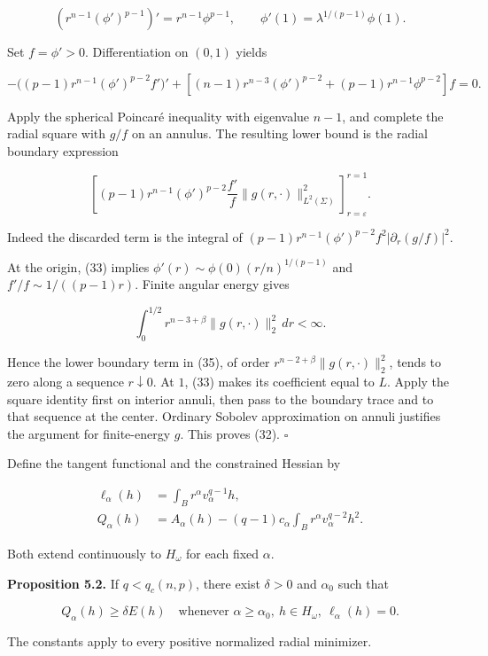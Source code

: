 \documentclass[11pt]{article}
\begin{document}
\[
(r^{n-1}(\phi')^{p-1})'=r^{n-1}\phi^{p-1},
\qquad \phi'(1)=\lambda^{1/(p-1)}\phi(1).
\tag{33}
\]

Set \(f=\phi'>0\). Differentiation on \((0,1)\) yields

\[
-\bigl((p-1)r^{n-1}(\phi')^{p-2}f'\bigr)'
+\left[(n-1)r^{n-3}(\phi')^{p-2}
 +(p-1)r^{n-1}\phi^{p-2}\right]f=0.
\tag{34}
\]

Apply the spherical Poincaré inequality with eigenvalue \(n-1\), and
complete the radial square with \(g/f\) on an annulus. The resulting
lower bound is the radial boundary expression

\[
\left[(p-1)r^{n-1}(\phi')^{p-2}\frac{f'}f
 \|g(r,\cdot)\|_{L^2(\Sigma)}^2\right]_{r=\varepsilon}^{r=1}.
\tag{35}
\]

Indeed the discarded term is the integral of
\((p-1)r^{n-1}(\phi')^{p-2}f^2|\partial_r(g/f)|^2\).

At the origin, (33) implies \(\phi'(r)\sim\phi(0)(r/n)^{1/(p-1)}\) and
\(f'/f\sim1/((p-1)r)\). Finite angular energy gives

\[
\int_0^{1/2}r^{n-3+\beta}\|g(r,\cdot)\|_2^2\,dr<\infty.
\]

Hence the lower boundary term in (35), of order
\(r^{n-2+\beta}\|g(r,\cdot)\|_2^2\), tends to zero along a sequence
\(r\downarrow0\). At \(1\), (33) makes its coefficient equal to \(L\).
Apply the square identity first on interior annuli, then pass to the
boundary trace and to that sequence at the center. Ordinary Sobolev
approximation on annuli justifies the argument for finite-energy \(g\).
This proves (32). \(\square\)

Define the tangent functional and the constrained Hessian by

\[
\begin{aligned}
\ell_\alpha(h)&=\int_Br^\alpha v_\alpha^{q-1}h,\\
Q_\alpha(h)&=A_\alpha(h)
 -(q-1)c_\alpha\int_Br^\alpha v_\alpha^{q-2}h^2.
\end{aligned}
\tag{36}
\]

Both extend continuously to \(H_\omega\) for each fixed \(\alpha\).

\textbf{Proposition 5.2.} If \(q<q_c(n,p)\), there exist \(\delta>0\)
and \(\alpha_0\) such that

\[
Q_\alpha(h)\ge\delta E(h)
\quad\text{whenever }\alpha\ge\alpha_0,\ h\in H_\omega,\ \ell_\alpha(h)=0.
\tag{37}
\]

The constants apply to every positive normalized radial minimizer.
\end{document}
